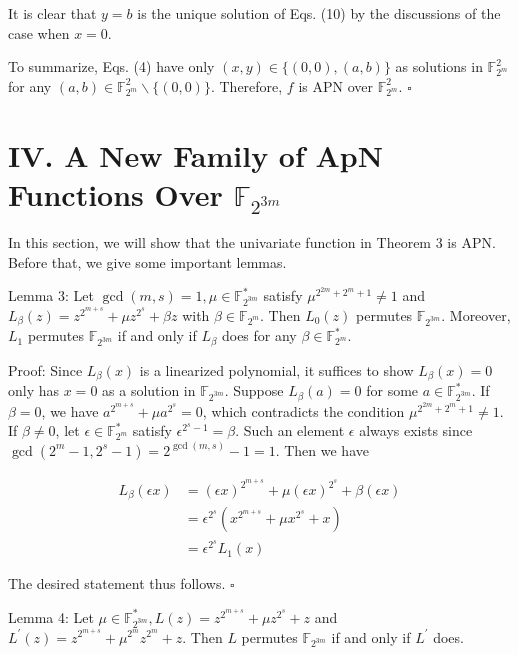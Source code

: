 \documentclass[10pt]{article}
\begin{document}
It is clear that $y=b$ is the unique solution of Eqs. (10) by the discussions of the case when $x=0$.

To summarize, Eqs. (4) have only $(x, y) \in\{(0,0),(a, b)\}$ as solutions in $\mathbb{F}_{2^{m}}^{2}$ for any $(a, b) \in \mathbb{F}_{2^{m}}^{2} \backslash\{(0,0)\}$. Therefore, $f$ is APN over $\mathbb{F}_{2^{m}}^{2}$. \(\square\)

\section*{IV. A New Family of ApN Functions Over $\mathbb{F}_{2^{3 m}}$}
In this section, we will show that the univariate function in Theorem 3 is APN. Before that, we give some important lemmas.

Lemma 3: Let $\operatorname{gcd}(m, s)=1, \mu \in \mathbb{F}_{2^{3 m}}^{*}$ satisfy $\mu^{2^{2 m}+2^{m}+1} \neq 1$ and $L_{\beta}(z)=z^{2^{m+s}}+\mu z^{2^{s}}+\beta z$ with $\beta \in \mathbb{F}_{2^{m}}$. Then $L_{0}(z)$ permutes $\mathbb{F}_{2^{3 m}}$. Moreover, $L_{1}$ permutes $\mathbb{F}_{2^{3 m}}$ if and only if $L_{\beta}$ does for any $\beta \in \mathbb{F}_{2^{m}}^{*}$.

Proof: Since $L_{\beta}(x)$ is a linearized polynomial, it suffices to show $L_{\beta}(x)=0$ only has $x=0$ as a solution in $\mathbb{F}_{2^{3 m}}$. Suppose $L_{\beta}(a)=0$ for some $a \in \mathbb{F}_{2^{3 m}}^{*}$. If $\beta=0$, we have $a^{2^{m+s}}+\mu a^{2^{s}}=0$, which contradicts the condition $\mu^{2^{2 m}+2^{m}+1} \neq 1$. If $\beta \neq 0$, let $\epsilon \in \mathbb{F}_{2^{m}}^{*}$ satisfy $\epsilon^{2^{s}-1}=\beta$. Such an element $\epsilon$ always exists since $\operatorname{gcd}\left(2^{m}-1,2^{s}-1\right)= 2^{\operatorname{gcd}(m, s)}-1=1$. Then we have

$$
\begin{aligned}
L_{\beta}(\epsilon x) & =(\epsilon x)^{2^{m+s}}+\mu(\epsilon x)^{2^{s}}+\beta(\epsilon x) \\
& =\epsilon^{2^{s}}\left(x^{2^{m+s}}+\mu x^{2^{s}}+x\right) \\
& =\epsilon^{2^{s}} L_{1}(x)
\end{aligned}
$$

The desired statement thus follows. \(\square\)

Lemma 4: Let $\mu \in \mathbb{F}_{2^{3 m}}^{*}, L(z)=z^{2^{m+s}}+\mu z^{2^{s}}+z$ and $L^{\prime}(z)=z^{2^{m+s}}+\mu^{2^{m}} z^{2^{m}}+z$. Then $L$ permutes $\mathbb{F}_{2^{3 m}}$ if and only if $L^{\prime}$ does.
\end{document}
